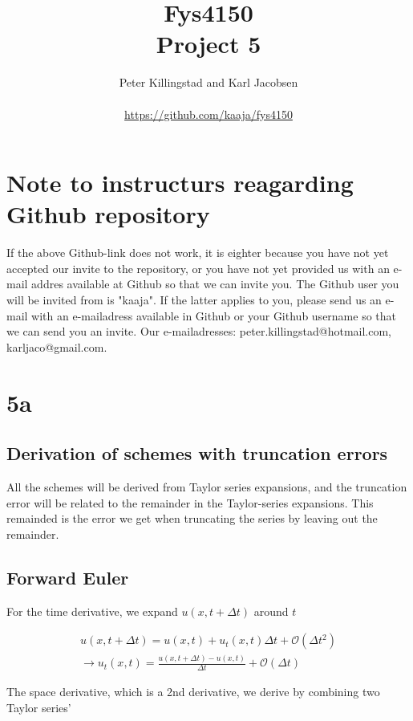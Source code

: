 \documentclass{article}
\title{Fys4150\\Project 5\\ }
\author{Peter Killingstad and Karl Jacobsen\\
\\
\url{https://github.com/kaaja/fys4150}}
\begin{document}
	
\maketitle

\section*{Note to instructurs reagarding Github repository}
If the above Github-link does not work, it is eighter because you have not yet accepted our invite to the repository, or you have not yet provided us with an e-mail addres available at Github so that we can invite you. The Github user you will be invited from is "kaaja". If the latter applies to you, please send us an e-mail with an e-mailadress available in Github or your Github username so that we can send you an invite. Our e-mailadresses: peter.killingstad@hotmail.com, karljaco@gmail.com.

\section{5a}

\subsection{Derivation of schemes with truncation errors}
All the schemes will be derived from Taylor series expansions, and the truncation error will be related to the remainder in the Taylor-series expansions. This remainded is the error we get when truncating the series by leaving out the remainder.\\

\subsection{Forward Euler}
For the time derivative, we expand $u(x, t + \Delta t)$ around $t$

\begin{subequations}
	\begin{align}
		u(x, t+ \Delta t)  = u(x,t) +  u_t(x,t) \Delta t + \mathcal{O}(\Delta t^2)\\
		\rightarrow u_t(x,t) = \frac{u(x, t+ \Delta t) - u(x,t)}{\Delta t} + \mathcal{O}(\Delta t)\label{eq:FeTime}
	\end{align}
\end{subequations}

The space derivative, which is a 2nd derivative, we derive by combining two Taylor series'
\end{document}
